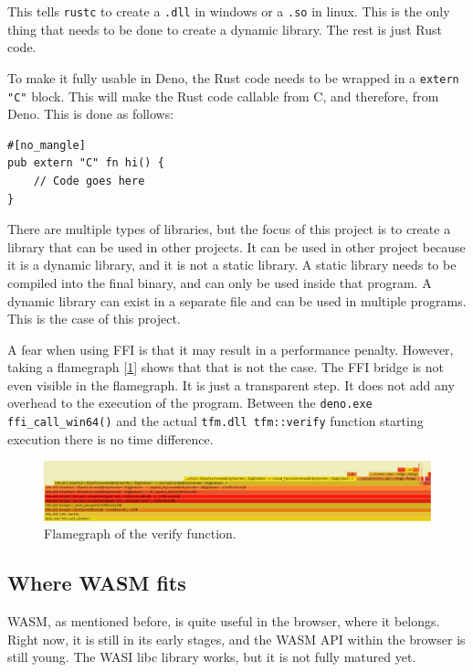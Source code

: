 \documentclass[10pt,journal,compsoc]{IEEEtran}
\begin{document}
This tells \verb|rustc| to create a \verb|.dll| in windows or a \verb|.so| in linux. This is the only thing that needs to be done to create a dynamic library. The rest is just Rust code.

To make it fully usable in Deno, the Rust code needs to be wrapped in a \verb|extern "C"| block. This will make the Rust code callable from C, and therefore, from Deno. This is done as follows:

\begin{lstlisting}
#[no_mangle]
pub extern "C" fn hi() {
    // Code goes here
}
\end{lstlisting}

There are multiple types of libraries, but the focus of this project is to create a library that can be used in other projects. It can be used in other project because it is a dynamic library, and it is not a static library. A static library needs to be compiled into the final binary, and can only be used inside that program. A dynamic library can exist in a separate file and can be used in multiple programs. This is the case of this project.

A fear when using FFI is that it may result in a performance penalty. However, taking a flamegraph [\ref{img:flamegraph}] shows that that is not the case. The FFI bridge is not even visible in the flamegraph. It is just a transparent step. It does not add any overhead to the execution of the program.
Between the \verb|deno.exe ffi_call_win64()| and the actual \verb|tfm.dll tfm::verify| function starting execution there is no time difference.

\begin{figure}
    \centering
    \includegraphics[width=\textwidth]{flamegraph}
    \caption{Flamegraph of the verify function.}
    \label{img:flamegraph}
\end{figure}


\subsection{Where WASM fits}

WASM, as mentioned before, is quite useful in the browser, where it belongs. Right now, it is still in its early stages, and the WASM API within the browser is still young. The WASI libc library works, but it is not fully matured yet.
\end{document}
